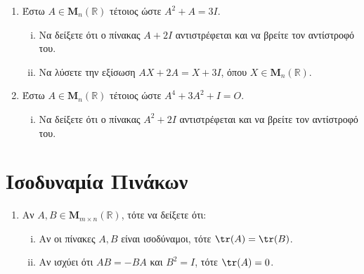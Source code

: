 \begin{enumerate}
  \item Έστω $ A \in \textbf{M}_{n}(\mathbb{R}) $ τέτοιος ώστε $ A^{2}+A=3I $. 
    \begin{enumerate}[i)]
      \item Να δείξετε ότι ο πίνακας $ A+2I $ αντιστρέφεται και να βρείτε τον αντίστροφό
        του.
      \item Να λύσετε την εξίσωση $ AX+2A=X+3I $, όπου 
        $ X \in \textbf{M}_{n}(\mathbb{R}) $.
    \end{enumerate}

  \item Έστω $ A \in \textbf{M}_{n}(\mathbb{R}) $ τέτοιος ώστε $ A^{4}+3A^{2}+I=Ο $. 
    \begin{enumerate}[i)]
      \item Να δείξετε ότι ο πίνακας $ A^{2}+2I $ αντιστρέφεται και να βρείτε τον 
        αντίστροφό του.
    \end{enumerate}


\end{enumerate}

\section*{Ισοδυναμία Πινάκων}

\begin{enumerate}
  \item Αν $ A,B \in \textbf{M}_{m \times n}(\mathbb{R}) $, τότε να δείξετε ότι:
    \begin{enumerate}[i)]
      \item Αν οι πίνακες $ A,B $ είναι ισοδύναμοι, τότε $ \tr(A)=\tr(B) $.
      \item Αν ισχύει ότι $ AB=-BA $ και $ B^{2}=I $, τότε $ \tr(A)=0 $.
    \end{enumerate}
\end{enumerate}







